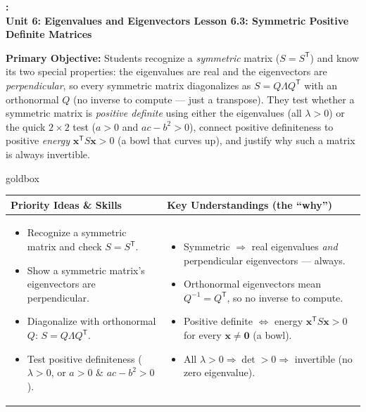 \documentclass[10pt]{article}
\newcommand{\xx}{\mathbf{x}}
\newcommand{\zero}{\mathbf{0}}
\newcommand{\T}{\mathsf{T}}
\newcommand{\UnitNumberName}{Unit 6: Eigenvalues and Eigenvectors \quad}
\newcommand{\LessonNumberName}{Lesson 6.3: Symmetric Positive Definite Matrices}
\begin{document}
\begin{center}
    {\Large\bfseries \CourseName: \SchoolYear \\
    {\small\bfseries \UnitNumberName \LessonNumberName}}
\end{center}

\begin{tcolorbox}[colback=blush, colframe=burgundy, boxrule=0.9pt, arc=2mm,
    left=2mm, right=2mm, top=1.5mm, bottom=1.5mm]
    \textbf{Primary Objective:} Students recognize a \emph{symmetric} matrix ($S=S^{\T}$) and know its two
    special properties: the eigenvalues are real and the eigenvectors are \emph{perpendicular}, so every
    symmetric matrix diagonalizes as $S=Q\Lambda Q^{\T}$ with an orthonormal $Q$ (no inverse to compute ---
    just a transpose). They test whether a symmetric matrix is \emph{positive definite} using either the
    eigenvalues (all $\lambda>0$) or the quick $2\times2$ test ($a>0$ and $ac-b^2>0$), connect positive
    definiteness to positive \emph{energy} $\xx^{\T}S\xx>0$ (a bowl that curves up), and justify why such a
    matrix is always invertible.
\end{tcolorbox}

\renewcommand{\arraystretch}{1.4}
\begin{skillbox}{goldbox}
\begin{tabularx}{\linewidth}{@{}X|X@{}}
\textbf{Priority Ideas \& Skills} & \textbf{Key Understandings (the ``why'')} \\[2pt]
\hline
\vspace{-6pt}
\begin{itemize}[leftmargin=1.1em, nosep, after=\vspace{2pt}]
  \item Recognize a symmetric matrix and check $S=S^{\T}$.
  \item Show a symmetric matrix's eigenvectors are perpendicular.
  \item Diagonalize with orthonormal $Q$: $S=Q\Lambda Q^{\T}$.
  \item Test positive definiteness ($\lambda>0$, or $a>0$ \& $ac-b^2>0$).
\end{itemize}
&
\vspace{-6pt}
\begin{itemize}[leftmargin=1.1em, nosep, after=\vspace{2pt}]
  \item Symmetric $\Rightarrow$ real eigenvalues \emph{and} perpendicular eigenvectors --- always.
  \item Orthonormal eigenvectors mean $Q^{-1}=Q^{\T}$, so no inverse to compute.
  \item Positive definite $\Leftrightarrow$ energy $\xx^{\T}S\xx>0$ for every $\xx\ne\zero$ (a bowl).
  \item All $\lambda>0\Rightarrow\det>0\Rightarrow$ invertible (no zero eigenvalue).
\end{itemize}
\end{tabularx}
\end{skillbox}
\end{document}
